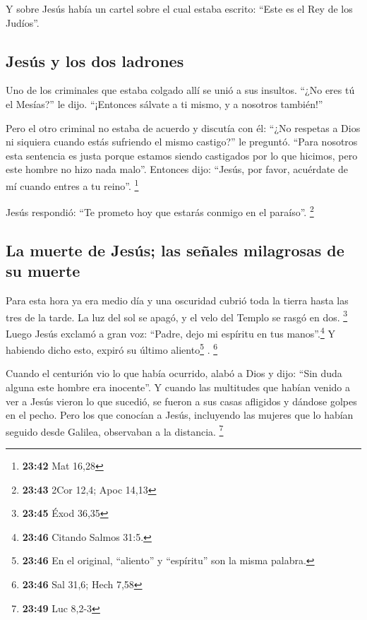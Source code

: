  Y sobre Jesús había un cartel sobre el cual estaba
escrito: ``Este es el Rey de los Judíos''.

\hypertarget{jesuxfas-y-los-dos-ladrones}{%
\subsection{Jesús y los dos
ladrones}\label{jesuxfas-y-los-dos-ladrones}}

 Uno de los criminales que estaba colgado allí se unió a
sus insultos. ``¿No eres tú el Mesías?'' le dijo. ``¡Entonces sálvate a
ti mismo, y a nosotros también!''

 Pero el otro criminal no estaba de acuerdo y discutía
con él: ``¿No respetas a Dios ni siquiera cuando estás sufriendo el
mismo castigo?'' le preguntó.  ``Para nosotros esta
sentencia es justa porque estamos siendo castigados por lo que hicimos,
pero este hombre no hizo nada malo''.  Entonces dijo:
``Jesús, por favor, acuérdate de mí cuando entres a tu reino''.
\footnote{\textbf{23:42} Mat 16,28}

 Jesús respondió: ``Te prometo hoy que estarás conmigo en
el paraíso''. \footnote{\textbf{23:43} 2Cor 12,4; Apoc 14,13}

\hypertarget{la-muerte-de-jesuxfas-las-seuxf1ales-milagrosas-de-su-muerte}{%
\subsection{La muerte de Jesús; las señales milagrosas de su
muerte}\label{la-muerte-de-jesuxfas-las-seuxf1ales-milagrosas-de-su-muerte}}

 Para esta hora ya era medio día y una oscuridad cubrió
toda la tierra hasta las tres de la tarde.  La luz del
sol se apagó, y el velo del Templo se rasgó en dos. \footnote{\textbf{23:45}
  Éxod 36,35}  Luego Jesús exclamó a gran voz: ``Padre,
dejo mi espíritu en tus manos''.\footnote{\textbf{23:46} Citando Salmos
  31:5.} Y habiendo dicho esto, expiró su último aliento\footnote{\textbf{23:46}
  En el original, ``aliento'' y ``espíritu'' son la misma palabra.} .
\footnote{\textbf{23:46} Sal 31,6; Hech 7,58}

 Cuando el centurión vio lo que había ocurrido, alabó a
Dios y dijo: ``Sin duda alguna este hombre era inocente''.
 Y cuando las multitudes que habían venido a ver a Jesús
vieron lo que sucedió, se fueron a sus casas afligidos y dándose golpes
en el pecho.  Pero los que conocían a Jesús, incluyendo
las mujeres que lo habían seguido desde Galilea, observaban a la
distancia. \footnote{\textbf{23:49} Luc 8,2-3}

